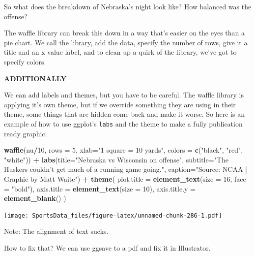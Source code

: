 \documentclass[
]{book}
\newenvironment{Shaded}{\begin{snugshade}}{\end{snugshade}}
\newcommand{\DataTypeTok}[1]{\textcolor[rgb]{0.13,0.29,0.53}{#1}}
\newcommand{\DecValTok}[1]{\textcolor[rgb]{0.00,0.00,0.81}{#1}}
\newcommand{\KeywordTok}[1]{\textcolor[rgb]{0.13,0.29,0.53}{\textbf{#1}}}
\newcommand{\NormalTok}[1]{#1}
\newcommand{\OperatorTok}[1]{\textcolor[rgb]{0.81,0.36,0.00}{\textbf{#1}}}
\newcommand{\StringTok}[1]{\textcolor[rgb]{0.31,0.60,0.02}{#1}}
\begin{document}
So what does the breakdown of Nebraska's night look like? How balanced was the offense?

The waffle library can break this down in a way that's easier on the eyes than a pie chart. We call the library, add the data, specify the number of rows, give it a title and an x value label, and to clean up a quirk of the library, we've got to specify colors.

\textbf{ADDITIONALLY}

We can add labels and themes, but you have to be careful. The waffle library is applying it's own theme, but if we override something they are using in their theme, some things that are hidden come back and make it worse. So here is an example of how to use ggplot's \texttt{labs} and the theme to make a fully publication ready graphic.

\begin{Shaded}
\begin{Highlighting}[]
\KeywordTok{waffle}\NormalTok{(nu}\OperatorTok{/}\DecValTok{10}\NormalTok{, }\DataTypeTok{rows =} \DecValTok{5}\NormalTok{, }\DataTypeTok{xlab=}\StringTok{"1 square = 10 yards"}\NormalTok{, }\DataTypeTok{colors =} \KeywordTok{c}\NormalTok{(}\StringTok{"black"}\NormalTok{, }\StringTok{"red"}\NormalTok{, }\StringTok{"white"}\NormalTok{)) }\OperatorTok{+}\StringTok{ }\KeywordTok{labs}\NormalTok{(}\DataTypeTok{title=}\StringTok{"Nebraska vs Wisconsin on offense"}\NormalTok{, }\DataTypeTok{subtitle=}\StringTok{"The Huskers couldn't get much of a running game going."}\NormalTok{, }\DataTypeTok{caption=}\StringTok{"Source: NCAA | Graphic by Matt Waite"}\NormalTok{) }\OperatorTok{+}\StringTok{ }
\StringTok{  }\KeywordTok{theme}\NormalTok{(}
    \DataTypeTok{plot.title =} \KeywordTok{element_text}\NormalTok{(}\DataTypeTok{size =} \DecValTok{16}\NormalTok{, }\DataTypeTok{face =} \StringTok{"bold"}\NormalTok{),}
    \DataTypeTok{axis.title =} \KeywordTok{element_text}\NormalTok{(}\DataTypeTok{size =} \DecValTok{10}\NormalTok{),}
    \DataTypeTok{axis.title.y =} \KeywordTok{element_blank}\NormalTok{()}
\NormalTok{  )}
\end{Highlighting}
\end{Shaded}

\texttt{[image: SportsData\_files/figure-latex/unnamed-chunk-286-1.pdf]}

Note: The alignment of text sucks.

How to fix that? We can use ggsave to a pdf and fix it in Illustrator.
\end{document}
